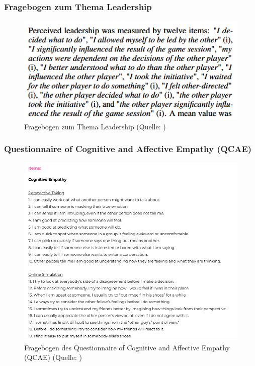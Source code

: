 \documentclass[
	12pt,
	a4paper,
	bibtotoc,
	cleardoubleempty, 
	idxtotoc,
	ngerman,
	openright
	final,
	listof=nochaptergap,
	]{scrbook}
\begin{document}
\begin{appendices}
\clearpage

\subsubsection{Fragebogen zum Thema Leadership}\label{sec:append_study_leader}

\begin{figure}[ht]
\centering
\includegraphics[width=1\linewidth]{content/attachments/questtionaires/Leadership.PNG}
\caption{Fragebogen zum Thema Leadership (Quelle: \citealp{emmerich_game_2016})}
\label{fig:append_leadership}
\end{figure}

\clearpage

\subsubsection{Questionnaire of Cognitive and Affective Empathy (QCAE)}

\begin{figure}[ht]
\centering
\includegraphics[width=1\linewidth]{content/attachments/questtionaires/QCAE.PNG}
\caption{Fragebogen des Questionnaire of Cognitive and Affective Empathy (QCAE) (Quelle: \citealp{noauthor_questionnaire_nodate})}
\label{fig:append_QCAE}
\end{figure}


\end{appendices}
\end{document}
